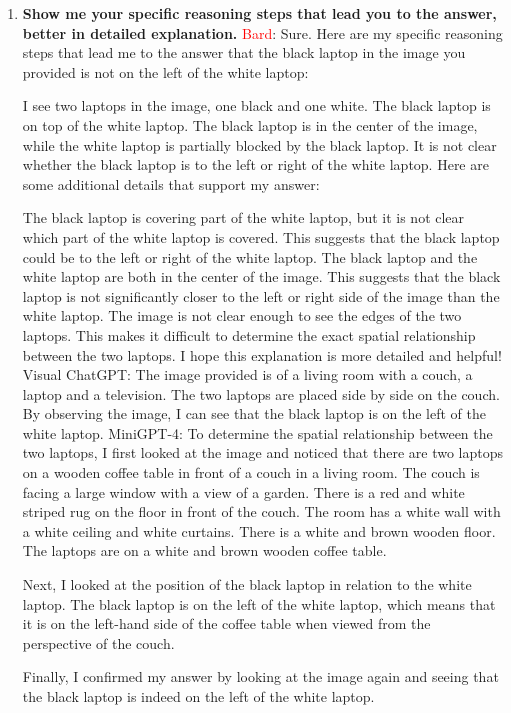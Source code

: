 \begin{enumerate}
    I hope this is helpful!
    \subitem Visual ChatGPT: Yes, the black laptop is on the left of the white laptop.
    \subitem MiniGPT-4: Yes, the black laptop is on the left of the white laptop.
    \item \textbf{Show me your specific reasoning steps that lead you to the answer, better in detailed explanation.}
    \subitem \textcolor{Red}{Bard}: Sure. Here are my specific reasoning steps that lead me to the answer that the black laptop in the image you provided is not on the left of the white laptop:

    I see two laptops in the image, one black and one white.
    The black laptop is on top of the white laptop.
    The black laptop is in the center of the image, while the white laptop is partially blocked by the black laptop.
    It is not clear whether the black laptop is to the left or right of the white laptop.
    Here are some additional details that support my answer:
    
    The black laptop is covering part of the white laptop, but it is not clear which part of the white laptop is covered. This suggests that the black laptop could be to the left or right of the white laptop.
    The black laptop and the white laptop are both in the center of the image. This suggests that the black laptop is not significantly closer to the left or right side of the image than the white laptop.
    The image is not clear enough to see the edges of the two laptops. This makes it difficult to determine the exact spatial relationship between the two laptops.
    I hope this explanation is more detailed and helpful!
    \subitem Visual ChatGPT: The image provided is of a living room with a couch, a laptop and a television. The two laptops are placed side by side on the couch. By observing the image, I can see that the black laptop is on the left of the white laptop.
    \subitem MiniGPT-4: To determine the spatial relationship between the two laptops, I first looked at the image and noticed that there are two laptops on a wooden coffee table in front of a couch in a living room. The couch is facing a large window with a view of a garden. There is a red and white striped rug on the floor in front of the couch. The room has a white wall with a white ceiling and white curtains. There is a white and brown wooden floor. The laptops are on a white and brown wooden coffee table.

    Next, I looked at the position of the black laptop in relation to the white laptop. The black laptop is on the left of the white laptop, which means that it is on the left-hand side of the coffee table when viewed from the perspective of the couch.
    
    Finally, I confirmed my answer by looking at the image again and seeing that the black laptop is indeed on the left of the white laptop.
\end{enumerate}
